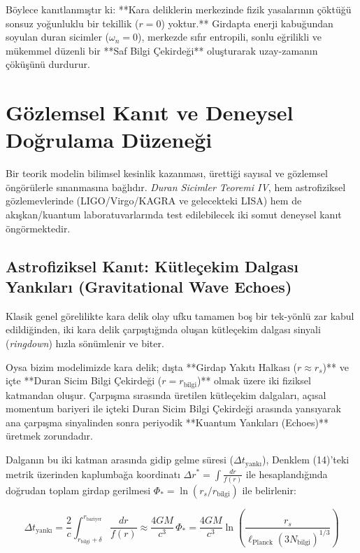 \documentclass[12pt,a4paper]{article}
\begin{document}
Böylece kanıtlanmıştır ki: **Kara deliklerin merkezinde fizik yasalarının çöktüğü sonsuz yoğunluklu bir tekillik ($r=0$) yoktur.** Girdapta enerji kabuğundan soyulan duran sicimler ($\omega_n = 0$), merkezde sıfır entropili, sonlu eğrilikli ve mükemmel düzenli bir **Saf Bilgi Çekirdeği** oluşturarak uzay-zamanın çöküşünü durdurur.

\section{Gözlemsel Kanıt ve Deneysel Doğrulama Düzeneği}

Bir teorik modelin bilimsel kesinlik kazanması, ürettiği sayısal ve gözlemsel öngörülerle sınanmasına bağlıdır. \textit{Duran Sicimler Teoremi IV}, hem astrofiziksel gözlemevlerinde (LIGO/Virgo/KAGRA ve gelecekteki LISA) hem de akışkan/kuantum laboratuvarlarında test edilebilecek iki somut deneysel kanıt öngörmektedir.

\subsection{Astrofiziksel Kanıt: Kütleçekim Dalgası Yankıları (Gravitational Wave Echoes)}

Klasik genel görelilikte kara delik olay ufku tamamen boş bir tek-yönlü zar kabul edildiğinden, iki kara delik çarpıştığında oluşan kütleçekim dalgası sinyali (\textit{ringdown}) hızla sönümlenir ve biter.

Oysa bizim modelimizde kara delik; dışta **Girdap Yakıtı Halkası ($r \approx r_s$)** ve içte **Duran Sicim Bilgi Çekirdeği ($r = r_{\text{bilgi}}$)** olmak üzere iki fiziksel katmandan oluşur. Çarpışma sırasında üretilen kütleçekim dalgaları, açısal momentum bariyeri ile içteki Duran Sicim Bilgi Çekirdeği arasında yansıyarak ana çarpışma sinyalinden sonra periyodik **Kuantum Yankıları (Echoes)** üretmek zorundadır.

Dalganın bu iki katman arasında gidip gelme süresi ($\Delta t_{\text{yankı}}$), Denklem (14)'teki metrik üzerinden kaplumbağa koordinatı $\Delta r^* = \int \frac{dr}{f(r)}$ ile hesaplandığında doğrudan toplam girdap gerilmesi $\Phi_* = \ln(r_s / r_{\text{bilgi}})$ ile belirlenir:

\begin{equation}
\Delta t_{\text{yankı}} = \frac{2}{c} \int_{r_{\text{bilgi}} + \delta}^{r_{\text{bariyer}}} \frac{dr}{f(r)} \approx \frac{4 G M}{c^3} \, \Phi_* = \frac{4 G M}{c^3} \ln\left( \frac{r_s}{\ell_{\text{Planck}} (3 N_{\text{bilgi}})^{1/3}} \right)
\end{equation}
\end{document}

